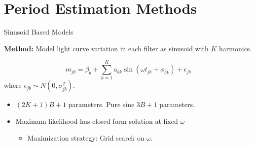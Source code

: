 \documentclass[12pt]{beamer}
\begin{document}






\section{Period Estimation Methods}



\begin{frame}{Sinusoid Based Models}

\textbf{Method:} Model light curve variation in each filter as sinusoid with $K$ harmonics. \cite{mondrik2015multiband,zechmeister2009generalised,lomb1976least,scargle1982studies,schwarzenberg1996fast}

\begin{equation*}
m_{jb} = \beta_b + \sum_{k=1}^K a_{bk}\sin(\omega t_{jb} + \phi_{bk}) + \epsilon_{jb}
\end{equation*}
where $\epsilon_{jb} \sim N(0,\sigma_{jb}^2)$.

\begin{itemize}
\item $(2K + 1)B + 1$ parameters. Pure sine $3B + 1$ parameters.
\item Maximum likelihood has closed form solution at fixed $\omega$
\begin{itemize}
\item Maximization strategy: Grid search on $\omega$.
\end{itemize}
\end{itemize}

\end{frame}
\end{document}
